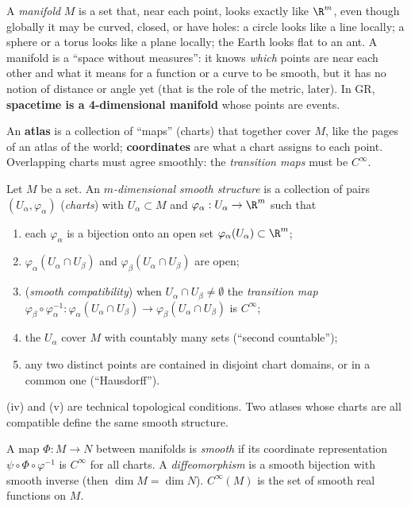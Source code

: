 \begin{intuition}
A \emph{manifold} $M$ is a set that, near each point, looks exactly like $\R^m$, even though globally it may be curved, closed, or have holes: a circle looks like a line locally; a sphere or a torus looks like a plane locally; the Earth looks flat to an ant. A manifold is a ``space without measures'': it knows \emph{which} points are near each other and what it means for a function or a curve to be smooth, but it has no notion of distance or angle yet (that is the role of the metric, later). In GR, \textbf{spacetime is a 4-dimensional manifold} whose points are events.

An \textbf{atlas} is a collection of ``maps'' (charts) that together cover $M$, like the pages of an atlas of the world; \textbf{coordinates} are what a chart assigns to each point. Overlapping charts must agree smoothly: the \emph{transition maps} must be $C^\infty$.
\end{intuition}

\begin{formal}
Let $M$ be a set. An \emph{$m$-dimensional smooth structure} is a collection of pairs $(U_\alpha,\varphi_\alpha)$ (\emph{charts}) with $U_\alpha\subset M$ and $\varphi_\alpha:U_\alpha\to\R^m$ such that
\begin{enumerate}[label=(\roman*),nosep]
\item each $\varphi_\alpha$ is a bijection onto an open set $\varphi_\alpha(U_\alpha)\subset\R^m$;
\item $\varphi_\alpha(U_\alpha\cap U_\beta)$ and $\varphi_\beta(U_\alpha\cap U_\beta)$ are open;
\item (\emph{smooth compatibility}) when $U_\alpha\cap U_\beta\ne\emptyset$ the \emph{transition map}
$\varphi_\beta\circ\varphi_\alpha^{-1}:\varphi_\alpha(U_\alpha\cap U_\beta)\to\varphi_\beta(U_\alpha\cap U_\beta)$ is $C^\infty$;
\item the $U_\alpha$ cover $M$ with countably many sets (``second countable'');
\item any two distinct points are contained in disjoint chart domains, or in a common one (``Hausdorff'').
\end{enumerate}
(iv) and (v) are technical topological conditions. Two atlases whose charts are all compatible define the same smooth structure.

A map $\Phi:M\to N$ between manifolds is \emph{smooth} if its coordinate representation $\psi\circ\Phi\circ\varphi^{-1}$ is $C^\infty$ for all charts. A \emph{diffeomorphism} is a smooth bijection with smooth inverse (then $\dim M=\dim N$). $C^\infty(M)$ is the set of smooth real functions on $M$.
\end{formal}

